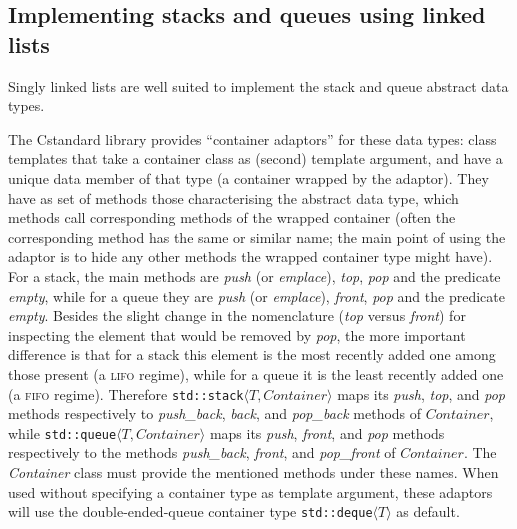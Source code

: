 \documentclass[12pt]{article}
\theoremstyle{plain}
\theoremstyle{definition}
\def\PP{\copy\PPbox}
\newcommand\Cee{\textsc{C}}
\newcommand\Cpp{\Cee\PP}
\newcommand\std[1]{\texttt{std::#1}}
\def\ang#1{\langle#1\rangle}
\begin{document}
\subsection{Implementing stacks and queues using linked lists}

Singly linked lists are well suited to implement the stack and queue abstract
data types.

The \Cpp standard library provides ``container adaptors'' for these data types:
class templates that take a container class as (second) template argument, and
have a unique data member of that type (a container wrapped by the adaptor).
They have as set of methods those characterising the abstract data type, which
methods call corresponding methods of the wrapped container (often the
corresponding method has the same or similar name; the main point of using the
adaptor is to hide any other methods the wrapped container type might have). For
a stack, the main methods are \textit{push} (or \textit{emplace}), \textit{top},
\textit{pop} and the predicate \textit{empty}, while for a queue they are
\textit{push} (or \textit{emplace}), \textit{front}, \textit{pop} and the
predicate \textit{empty}. Besides the slight change in the nomenclature
(\textit{top} versus \textit{front}) for inspecting the element that would be
removed by \textit{pop}, the more important difference is that for a stack this
element is the most recently added one among those present (a \textsc{lifo}
regime), while for a queue it is the least recently added one (a \textsc{fifo}
regime). Therefore \std{stack}$\ang{T,\textit{Container}}$ maps its
\textit{push}, \textit{top}, and \textit{pop} methods respectively to
\textit{push\_back}, \textit{back}, and \textit{pop\_back} methods of
$\textit{Container}$, while \std{queue}$\ang{T,\textit{Container}}$ maps its
\textit{push}, \textit{front}, and \textit{pop} methods respectively to the
methods \textit{push\_back}, \textit{front}, and \textit{pop\_front} of
$\textit{Container}$. The \textit{Container} class must provide the mentioned
methods under these names. When used without specifying a container type as
template argument, these adaptors will use the double-ended-queue container type
\std{deque}$\ang{T}$ as default.
\end{document}
